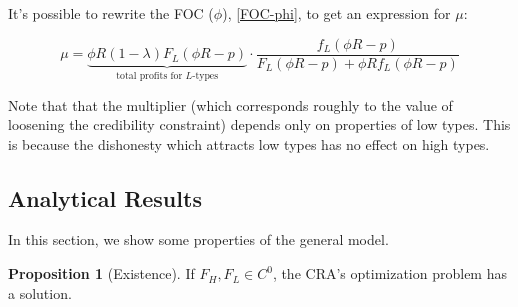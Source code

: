 \documentclass{article}
\theoremstyle{definition}
\newtheorem{proposition}{Proposition}
\begin{document}
It's possible to rewrite the FOC ($\phi$), \eqref{FOC-phi}, to get an expression for $\mu$: 

\begin{equation}
    \label{mu}
    \mu = \underbrace{\phi R(1 - \lambda)F_L(\phi R - p)}_{\text{total profits for $L$-types}} \cdot \frac{f_L(\phi R - p)}{F_L(\phi R - p) + \phi R f_L (\phi R - p)}
\end{equation}

Note that that the multiplier (which corresponds roughly to the value of loosening the credibility constraint) depends only on properties of low types. This is because the dishonesty which attracts low types has no effect on high types. 

\newpage

\subsection{Analytical Results}

In this section, we show some properties of the general model.

\begin{proposition}[Existence]
    \label{existence}
If $F_H, F_L \in C^0$, the CRA's optimization problem has a solution.
\end{proposition}
\end{document}
